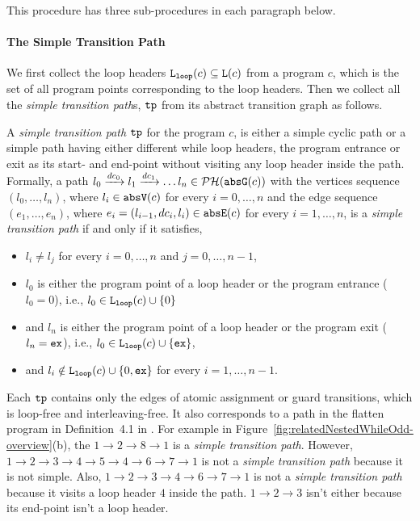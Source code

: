 This procedure has three sub-procedures in each paragraph below.
\paragraph{The Simple Transition Path}
We first collect the loop headers $\mathtt{L}_{\mathtt{loop}}(c) \subseteq \mathtt{L}(c)$ from a program $c$, which is the set of all program points corresponding to the loop headers.
Then we collect all the \emph{simple transition path}s, $\mathtt{tp}$ from its abstract transition graph as follows.
\begin{defn}
 \label{def:tpath}
A \emph{simple transition path}
$\mathtt{tp}$ for the program $c$, is either a simple cyclic path
or a simple path having either different while loop headers, the program entrance or exit as its start- and end-point
without visiting any loop header inside the path.
\\
Formally, a path $l_0 \xrightarrow{dc_0} l_1 \xrightarrow{dc_1} \ldots l_n \in \mathcal{PH}(\mathtt{abs}{\mathtt{G}}(c))$ with the
vertices sequence $(l_0, \ldots, l_n)$, where $l_i \in \mathtt{abs}{\mathtt{V}}(c)$ for every $i = 0, \ldots, n$ and
%
the edge sequence $(e_1, \ldots, e_n)$, where $e_i = (l_{i - 1}, dc_i, l_{i}) \in \mathtt{abs}{\mathtt{E}}(c)$ for every $i = 1, \ldots, n$,
%
is a \emph{simple transition path} if and only if it satisfies,
\begin{itemize}
 \item $l_i \neq l_j$ for every $i = 0, \ldots, n$ and $j = 0, \ldots, {n - 1}$,
 \item $l_0$ is either the program point of a loop header or the program entrance ($l_0 = 0$),
 i.e., $l_0 \in \mathtt{L}_{\mathtt{loop}}(c) \cup \{ 0 \}$
 \item and $l_n$ is either the program point of a loop header or the program exit ($l_n = \mathtt{ex}$),
 i.e., $l_0 \in \mathtt{L}_{\mathtt{loop}}(c) \cup \{ \mathtt{ex} \}$,
 \item and $l_i \notin \mathtt{L}_{\mathtt{loop}}(c) \cup \{ 0, \mathtt{ex} \}$ for every $i = 1, \ldots, n-1$.
\end{itemize}
\end{defn}
Each $\mathtt{tp}$ 
contains only the edges of atomic assignment or guard transitions, which is loop-free and interleaving-free.
It also corresponds to a path in the flatten program in Definition~4.1 in \cite{GulwaniJK09}.
For example in Figure~\ref{fig:relatedNestedWhileOdd-overview}(b), the $1 \to 2 \to 8 \to 1$ is a \emph{simple transition path}.
However, $1 \to 2 \to 3 \to 4 \to 5 \to 4 \to 6 \to 7 \to 1$ is not a \emph{simple transition path} because it is not simple.
Also, $1 \to 2 \to 3 \to 4 \to 6 \to 7 \to 1$ is not a \emph{simple transition path} because it visits a loop header $4$ inside the path. $1 \to 2 \to 3$ isn't either because its end-point isn't a loop header.

